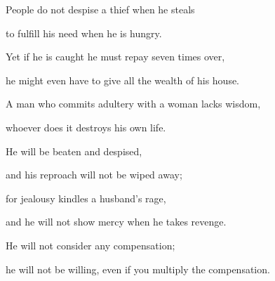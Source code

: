 {\par }{\Q {}People do not
despise
a thief
when
he steals
\par }{\Q to fulfill
his need
when
he is hungry.
\par }{\Q {}Yet if he is caught
he must repay
seven times
over,
\par }{\Q he might even have to give
all
the wealth
of his house.
\par }{\Q {}A man who commits adultery
with a woman
lacks
wisdom,
\par }{\Q whoever does it destroys
his own life.
\par }{\Q {}He will be
beaten
and despised,
\par }{\Q and his reproach
will not
be wiped away;
\par }{\Q {}for
jealousy
kindles a husband’s
rage,
\par }{\Q and he will not
show mercy
when
he takes revenge.
\par }{\Q {}He will not
consider
any
compensation;
\par }{\Q he will not
be willing,
even if
you multiply
the compensation.


}
